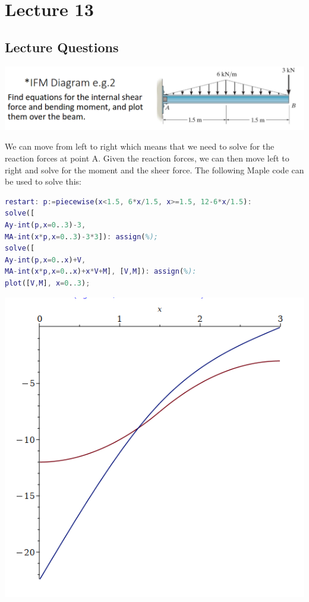 \documentclass{article}[14pt, letterpaper, Times New Roman]
\begin{document}
\section{Lecture 13}

\subsection{Lecture Questions}

\includegraphics[width=15cm]{l13-lq.png}

We can move from left to right which means that we need to solve for the reaction forces at point A.
Given the reaction forces, we can then move left to right and solve for the moment and the sheer force.
The following Maple code can be used to solve this:

\begin{lstlisting}[language=matlab]
restart: p:=piecewise(x<1.5, 6*x/1.5, x>=1.5, 12-6*x/1.5):
solve([
Ay-int(p,x=0..3)-3,
MA-int(x*p,x=0..3)-3*3]): assign(%);
solve([
Ay-int(p,x=0..x)+V,
MA-int(x*p,x=0..x)+x*V+M], [V,M]): assign(%):
plot([V,M], x=0..3);
\end{lstlisting}

\includegraphics[width=15cm]{l13-lq-o.png}
\end{document}

